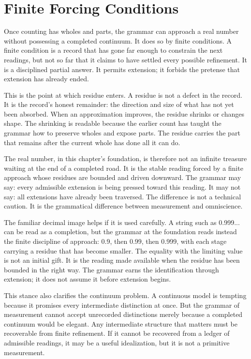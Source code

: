 \section{Finite Forcing Conditions}

Once counting has wholes and parts, the grammar can approach a real
number without possessing a completed continuum. It does so by finite
conditions. A finite condition is a record that has gone far enough to
constrain the next readings, but not so far that it claims to have
settled every possible refinement. It is a disciplined partial answer.
It permits extension; it forbids the pretense that extension has already
ended.

This is the point at which residue enters. A residue is not a defect in
the record. It is the record's honest remainder: the direction and size
of what has not yet been absorbed. When an approximation improves, the
residue shrinks or changes shape. The shrinking is readable because the
earlier count has taught the grammar how to preserve wholes and expose
parts. The residue carries the part that remains after the current whole
has done all it can do.

The real number, in this chapter's foundation, is therefore not an
infinite treasure waiting at the end of a completed road. It is the
stable reading forced by a finite approach whose residues are bounded
and driven downward. The grammar may say: every admissible extension is
being pressed toward this reading. It may not say: all extensions have
already been traversed. The difference is not a technical caution. It is
the grammatical difference between measurement and omniscience.

The familiar decimal image helps if it is used carefully. A string such
as 0.999... can be read as a completion, but the grammar at the
foundation reads instead the finite discipline of approach: 0.9, then
0.99, then 0.999, with each stage carrying a residue that has become
smaller. The equality with the limiting value is not an initial gift. It
is the reading made available when the residue has been bounded in the
right way. The grammar earns the identification through extension; it
does not assume it before extension begins.

This stance also clarifies the continuum problem. A continuous model is
tempting because it promises every intermediate distinction at once. But
the grammar of measurement cannot accept unrecorded distinctions merely
because a completed continuum would be elegant. Any intermediate
structure that matters must be recoverable from finite refinement. If it
cannot be recovered from a ledger of admissible readings, it may be a
useful idealization, but it is not a primitive measurement.

